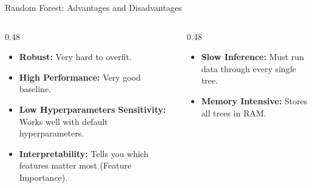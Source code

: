 \begin{frame}{Random Forest: Advantages and Disadvantages}
    \begin{columns}[T]
        \begin{column}{0.48\textwidth}
            \begin{tcolorbox}[colback=green!5, title=\textbf{Advantages}]
                \small
                \begin{itemize}
                    \item \textbf{Robust:} Very hard to overfit.
                    \item \textbf{High Performance:} Very good baseline.
                    \item \textbf{Low Hyperparameters Sensitivity:} Works well with default hyperparameters.
                    \item \textbf{Interpretability:} Tells you which features matter most (Feature Importance).
                \end{itemize}
            \end{tcolorbox}
        \end{column}
        \begin{column}{0.48\textwidth}
            \begin{tcolorbox}[colback=red!5, title=\textbf{Disadvantages}]
                \small
                \begin{itemize}
                    \item \textbf{Slow Inference:} Must run data through every single tree.
                    \item \textbf{Memory Intensive:} Stores all trees in RAM.
                \end{itemize}
            \end{tcolorbox}
        \end{column}
    \end{columns}
\end{frame}


